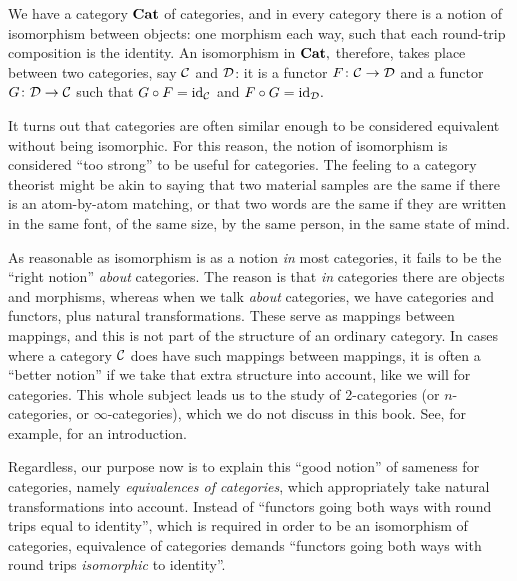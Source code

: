 \documentclass[CT4S-EN-RU]{subfiles}
\begin{document}
\begin{blockENG}
We have a category ${\mathbf{Cat}}$ of categories, and in every category there is a notion of isomorphism between objects: one morphism each way, such that each round-trip composition is the identity. An isomorphism in ${\mathbf{Cat}},$ therefore, takes place between two categories, say $\mathcal{C}$ and $\mathcal{D}$: it is a functor $F\colon\mathcal{C}\rightarrow\mathcal{D}$ and a functor $G\colon\mathcal{D}\rightarrow\mathcal{C}$ such that $G\circ F=\textnormal{id}_\mathcal{C}$ and $F\circ G=\textnormal{id}_\mathcal{D}.$ 
\end{blockENG}

\begin{blockRUS}
\end{blockRUS}

\begin{blockENG}
It turns out that categories are often similar enough to be considered equivalent without being isomorphic. For this reason, the notion of isomorphism is considered “too strong” to be useful for categories. The feeling to a category theorist might be akin to saying that two material samples are the same if there is an atom-by-atom matching, or that two words are the same if they are written in the same font, of the same size, by the same person, in the same state of mind. 
\end{blockENG}

\begin{blockRUS}
\end{blockRUS}

\begin{blockENG}
As reasonable as isomorphism is as a notion {\em in} most categories, it fails to be the “right notion” {\em about} categories. The reason is that {\em in} categories there are objects and morphisms, whereas when we talk {\em about} categories, we have categories and functors, plus natural transformations. These serve as mappings between mappings, and this is not part of the structure of an ordinary category. In cases where a category $\mathcal{C}$ does have such mappings between mappings, it is often a “better notion” if we take that extra structure into account, like we will for categories. This whole subject leads us to the study of 2-categories (or $n$-categories, or $\infty$-categories), which we do not discuss in this book. See, for example, \cite{Le1} for an introduction.
\end{blockENG}

\begin{blockRUS}
\end{blockRUS}

\begin{blockENG}
Regardless, our purpose now is to explain this “good notion” of sameness for categories, namely {\em equivalences of categories}, which appropriately take natural transformations into account. Instead of “functors going both ways with round trips equal to identity”, which is required in order to be an isomorphism of categories, equivalence of categories demands “functors going both ways with round trips {\em isomorphic} to identity”.
\end{blockENG}
\end{document}
